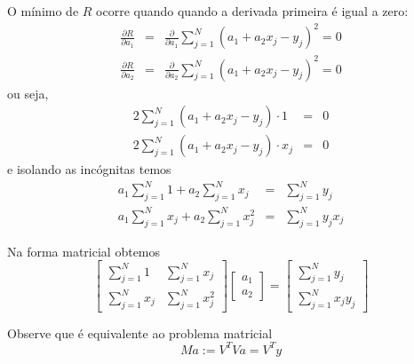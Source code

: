 O mínimo de $R$ ocorre quando quando a derivada primeira é igual a zero:
\begin{eqnarray*}
  \frac{\partial R}{\partial a_1} &=& \frac{\partial }{\partial a_1} \sum_{j=1}^N (a_1 + a_2 x_j-y_j)^2 =0 \\
  \frac{\partial R}{\partial a_2} &=& \frac{\partial }{\partial a_2} \sum_{j=1}^N (a_1 + a_2 x_j-y_j)^2 =0 
\end{eqnarray*}
ou seja,
\begin{eqnarray*}
   2 \sum_{j=1}^N (a_1 + a_2 x_j-y_j)\cdot 1 &=&0 \\
   2 \sum_{j=1}^N (a_1 + a_2 x_j-y_j)\cdot x_j &=&0 
\end{eqnarray*}
e isolando as incógnitas temos
\begin{eqnarray*}
   a_1\sum_{j=1}^N 1 + a_2 \sum_{j=1}^Nx_j &=&\sum_{j=1}^N y_j\\
   a_1\sum_{j=1}^N x_j + a_2 \sum_{j=1}^Nx_j^2 &=&\sum_{j=1}^N y_jx_j
\end{eqnarray*}

Na forma matricial obtemos
\begin{equation}
  \begin{bmatrix}
     \sum_{j=1}^N 1 &  \sum_{j=1}^N x_j \\
     \sum_{j=1}^N x_j &  \sum_{j=1}^N x_j^2 
  \end{bmatrix}
  \begin{bmatrix}
     a_1 \\
     a_2 
  \end{bmatrix}=
  \begin{bmatrix}
     \sum_{j=1}^N y_j \\
     \sum_{j=1}^N x_j y_j 
  \end{bmatrix}
\end{equation}

Observe que é equivalente ao problema matricial
\begin{equation}
   Ma := V^TV a = V^Ty
\end{equation}



